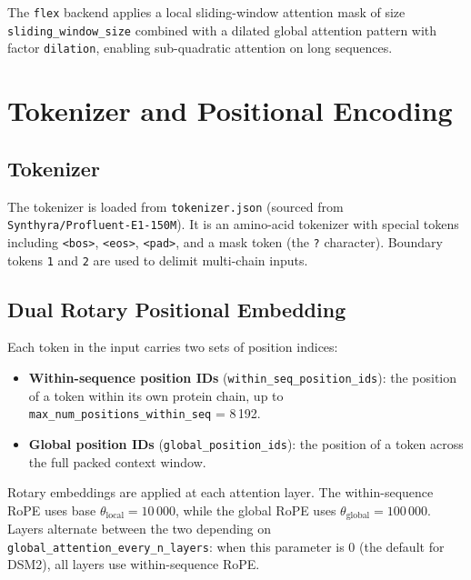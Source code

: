 \documentclass[11pt,a4paper]{article}
\begin{document}
The \texttt{flex} backend applies a local sliding-window attention mask of size
\texttt{sliding\_window\_size} combined with a dilated global attention pattern with factor
\texttt{dilation}, enabling sub-quadratic attention on long sequences.

\section{Tokenizer and Positional Encoding}
\label{sec:rope}

\subsection{Tokenizer}

The tokenizer is loaded from \texttt{tokenizer.json} (sourced from
\texttt{Synthyra/Profluent-E1-150M}).  It is an amino-acid tokenizer with special tokens including
\texttt{<bos>}, \texttt{<eos>}, \texttt{<pad>}, and a mask token (the \texttt{?} character).
Boundary tokens \texttt{1} and \texttt{2} are used to delimit multi-chain inputs.

\subsection{Dual Rotary Positional Embedding}

Each token in the input carries two sets of position indices:

\begin{itemize}
  \item \textbf{Within-sequence position IDs} (\texttt{within\_seq\_position\_ids}): the
        position of a token within its own protein chain, up to
        \texttt{max\_num\_positions\_within\_seq} = 8\,192.
  \item \textbf{Global position IDs} (\texttt{global\_position\_ids}): the position of a token
        across the full packed context window.
\end{itemize}

Rotary embeddings are applied at each attention layer.  The within-sequence RoPE uses base
$\theta_{\mathrm{local}} = 10\,000$, while the global RoPE uses
$\theta_{\mathrm{global}} = 100\,000$.  Layers alternate between the two depending on
\texttt{global\_attention\_every\_n\_layers}: when this parameter is 0 (the default for DSM2),
all layers use within-sequence RoPE.
\end{document}
